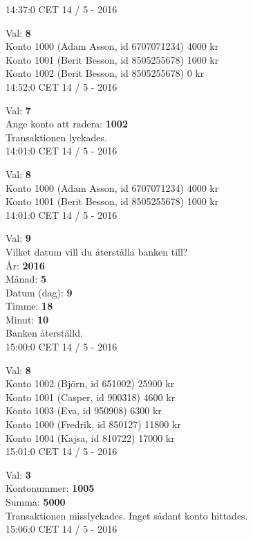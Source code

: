 \begin{multicols}{2}
\begin{exampleblock}
14:37:0 CET 14 / 5 - 2016\\
\end{exampleblock}
\begin{exampleblock}
Val: \textbf{8}\\
Konto 1000 (Adam Asson, id 6707071234) 4000 kr\\
Konto 1001 (Berit Besson, id 8505255678) 1000 kr\\
Konto 1002 (Berit Besson, id 8505255678) 0 kr\\
14:52:0 CET 14 / 5 - 2016\\
\end{exampleblock}
\begin{exampleblock}
Val: \textbf{7}\\
Ange konto att radera: \textbf{1002}\\
Transaktionen lyckades.\\
14:01:0 CET 14 / 5 - 2016\\
\end{exampleblock}
\begin{exampleblock}
Val: \textbf{8}\\
Konto 1000 (Adam Asson, id 6707071234) 4000 kr\\
Konto 1001 (Berit Besson, id 8505255678) 1000 kr\\
14:01:0 CET 14 / 5 - 2016\\
\end{exampleblock}
\begin{exampleblock}
Val: \textbf{9}\\
Vilket datum vill du återställa banken till?\\
År: \textbf{2016}\\
Månad: \textbf{5}\\
Datum (dag): \textbf{9}\\
Timme: \textbf{18}\\
Minut: \textbf{10}\\
Banken återställd.\\
15:00:0 CET 14 / 5 - 2016\\
\end{exampleblock}
\begin{exampleblock}
Val: \textbf{8}\\
Konto 1002 (Björn, id 651002) 25900 kr\\
Konto 1001 (Casper, id 900318) 4600 kr\\
Konto 1003 (Eva, id 950908) 6300 kr\\
Konto 1000 (Fredrik, id 850127) 11800 kr\\
Konto 1004 (Kajsa, id 810722) 17000 kr\\
15:01:0 CET 14 / 5 - 2016\\
\end{exampleblock}
\begin{exampleblock}
Val: \textbf{3}\\
Kontonummer: \textbf{1005}\\
Summa: \textbf{5000}\\
Transaktionen misslyckades. Inget sådant konto hittades.\\
15:06:0 CET 14 / 5 - 2016\\
\end{exampleblock}

\end{multicols}
